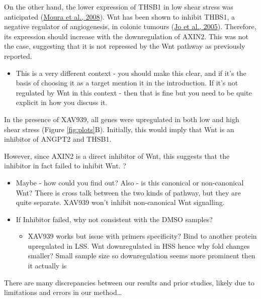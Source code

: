 \documentclass[
  11pt,
]{article}
\providecommand{\tightlist}{%
  \setlength{\itemsep}{0pt}\setlength{\parskip}{0pt}}
\begin{document}
On the other hand, the lower expression of THSB1 in low shear stress was anticipated (\protect\hyperlink{ref-Moura2008}{Moura et al., 2008}).
Wnt has been shown to inhibit THBS1, a negative regulator of angiogenesis, in colonic tumours (\protect\hyperlink{ref-jo2005}{Jo et al., 2005}).
Therefore, its expression should increase with the downregulation of AXIN2.
This was not the case, suggesting that it is not repressed by the Wnt pathway as previously reported.

\color{red}

\begin{itemize}
\tightlist
\item
  This is a very different context - you should make this clear, and if it's the basis of choosing it as a target mention it in the introduction.
  If it's not regulated by Wnt in this context - then that is fine but you need to be quite explicit in how you discuss it.
\end{itemize}

\color{black}

In the presence of XAV939, all genes were upregulated in both low and high shear stress (Figure \ref{fig:plots}B).
Initially, this would imply that Wnt is an inhibitor of ANGPT2 and THSB1.

However, since AXIN2 is a direct inhibitor of Wnt, this suggests that the inhibitor in fact failed to inhibit Wnt.
?

\color{red}

\begin{itemize}
\item
  Maybe - how could you find out?
  Also - is this canonical or non-canonical Wnt?
  There is cross talk between the two kinds of pathway, but they are quite separate.
  XAV939 won't inhibit non-canonical Wnt signalling.
\item
  If Inhibitor failed, why not consistent with the DMSO samples?

  \begin{itemize}
  \tightlist
  \item
    XAV939 works but issue with primers specificity? Bind to another protein upregulated in LSS. Wnt downregulated in HSS hence why fold changes smaller? Small sample size so downregulation seems more prominent then it actually is
  \end{itemize}
\end{itemize}

\color{black}

There are many discrepancies between our results and prior studies, likely due to limitations and errors in our method\ldots{}
\end{document}
